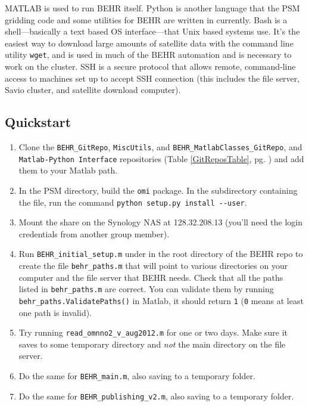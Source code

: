\documentclass[12pt]{article}
\begin{document}
	MATLAB is used to run BEHR itself. Python is another language that the PSM gridding code and some utilities for BEHR are written in currently. Bash is a shell---basically a text based OS interface---that Unix based systems use. It's the easiest way to download large amounts of satellite data with the command line utility \texttt{wget}, and is used in much of the BEHR automation and is necessary to work on the cluster. SSH is a secure protocol that allows remote, command-line access to machines set up to accept SSH connection (this includes the file server, Savio cluster, and satellite download computer).
	
	
	\subsection{Quickstart}
	\begin{enumerate}
	\item Clone the \lstinline$BEHR_GitRepo$, \lstinline$MiscUtils$, and \lstinline$BEHR_MatlabClasses_GitRepo$, and \lstinline$Matlab-Python Interface$ repositories (Table \ref{GitReposTable}, pg. \pageref{GitReposTable}) and add them to your Matlab path.
	\item In the PSM directory, build the \lstinline$omi$ package. In the  subdirectory containing the  file, run the command \lstinline$python setup.py install --user$.
	\item Mount the  share on the Synology NAS at 128.32.208.13 (you'll need the login credentials from another group member).
	\item Run \lstinline$BEHR_initial_setup.m$ under in the root directory of the BEHR repo to create the file \lstinline$behr_paths.m$ that will point to various directories on your computer and the file server that BEHR needs. Check that all the paths listed in \lstinline$behr_paths.m$ are correct. You can validate them by running \lstinline$behr_paths.ValidatePaths()$ in Matlab, it should return \lstinline$1$ (\lstinline$0$ means at least one path is invalid). 
	\item Try running \lstinline$read_omnno2_v_aug2012.m$ for one or two days. Make sure it saves to some temporary directory and \emph{not} the main  directory on the file server.
	\item Do the same for \lstinline$BEHR_main.m$, also saving to a temporary folder.
	\item Do the same for \lstinline$BEHR_publishing_v2.m$, also saving to a temporary folder.
	\end{enumerate}
\end{document}
